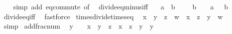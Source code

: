 \begin{isabellebody}
%
\isadelimproof
\ \ %
\endisadelimproof
%
\isatagproof
{}\isamarkupfalse%
\ {\isacharparenleft}{\kern0pt}simp\ add{\isacharcolon}{\kern0pt}\ eq{\isacharunderscore}{\kern0pt}commute\ {\isacharbrackleft}{\kern0pt}of\ {}{\isacharbrackright}{\kern0pt}{\isacharparenright}{\kern0pt}%
\endisatagproof
{\isafoldproof}%
%
\isadelimproof
\isanewline
%
\endisadelimproof
\isanewline
{}\isamarkupfalse%
\ divide{\isacharunderscore}{\kern0pt}eq{\isacharunderscore}{\kern0pt}minus{\isacharunderscore}{\kern0pt}{}{\isacharunderscore}{\kern0pt}iff{\isacharcolon}{\kern0pt}\isanewline
\ \ \ {\isachardoublequoteopen}{\isacharparenleft}{\kern0pt}a\ {\isacharslash}{\kern0pt}\ b\ {\isacharequal}{\kern0pt}\ {\isacharminus}{\kern0pt}\ {}{\isacharparenright}{\kern0pt}\ {\isasymlongleftrightarrow}\ b\ {\isasymnoteq}\ {}\ {\isasymand}\ a\ {\isacharequal}{\kern0pt}\ {\isacharminus}{\kern0pt}\ b{\isachardoublequoteclose}\isanewline
%
\isadelimproof
%
\endisadelimproof
%
\isatagproof
{}\isamarkupfalse%
\ divide{\isacharunderscore}{\kern0pt}eq{\isacharunderscore}{\kern0pt}{}{\isacharunderscore}{\kern0pt}iff\ \isamarkupfalse%
\ fastforce%
\endisatagproof
{\isafoldproof}%
%
\isadelimproof
\isanewline
%
\endisadelimproof
\isanewline
{}\isamarkupfalse%
\ times{\isacharunderscore}{\kern0pt}divide{\isacharunderscore}{\kern0pt}times{\isacharunderscore}{\kern0pt}eq{\isacharcolon}{\kern0pt}\isanewline
\ \ {\isachardoublequoteopen}{\isacharparenleft}{\kern0pt}x\ {\isacharslash}{\kern0pt}\ y{\isacharparenright}{\kern0pt}\ {\isacharasterisk}{\kern0pt}\ {\isacharparenleft}{\kern0pt}z\ {\isacharslash}{\kern0pt}\ w{\isacharparenright}{\kern0pt}\ {\isacharequal}{\kern0pt}\ {\isacharparenleft}{\kern0pt}x\ {\isacharasterisk}{\kern0pt}\ z{\isacharparenright}{\kern0pt}\ {\isacharslash}{\kern0pt}\ {\isacharparenleft}{\kern0pt}y\ {\isacharasterisk}{\kern0pt}\ w{\isacharparenright}{\kern0pt}{\isachardoublequoteclose}\isanewline
%
\isadelimproof
\ \ %
\endisadelimproof
%
\isatagproof
{}\isamarkupfalse%
\ simp%
\endisatagproof
{\isafoldproof}%
%
\isadelimproof
\isanewline
%
\endisadelimproof
\isanewline
{}\isamarkupfalse%
\ add{\isacharunderscore}{\kern0pt}frac{\isacharunderscore}{\kern0pt}num{\isacharcolon}{\kern0pt}\isanewline
\ \ {\isachardoublequoteopen}y\ {\isasymnoteq}\ {}\ {\isasymLongrightarrow}\ x\ {\isacharslash}{\kern0pt}\ y\ {\isacharplus}{\kern0pt}\ z\ {\isacharequal}{\kern0pt}\ {\isacharparenleft}{\kern0pt}x\ {\isacharplus}{\kern0pt}\ z\ {\isacharasterisk}{\kern0pt}\ y{\isacharparenright}{\kern0pt}\ {\isacharslash}{\kern0pt}\ y{\isachardoublequoteclose}\isanewline

\end{isabellebody}
